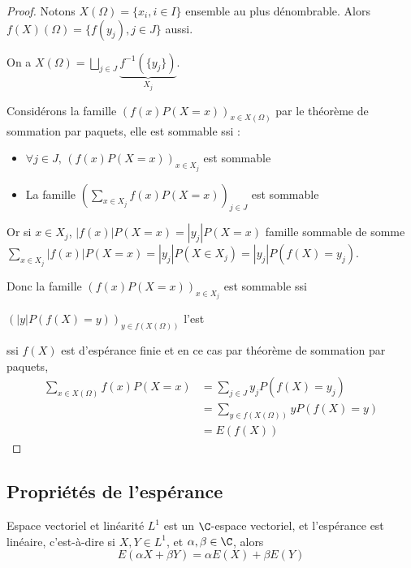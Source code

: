 \begin{proof}
    Notons $X(\Omega) = \{x_i, i \in I\}$ ensemble au plus dénombrable. Alors 
    $f(X)(\Omega) = \{f(y_j), j \in J\}$ aussi.

    On a $X(\Omega) = \bigsqcup_{j \in J} \underbrace{f^{-1}(\{y_j\})}_{X_j}$.

    Considérons la famille $(f(x) P(X = x))_{x \in X(\Omega)}$ par le théorème de sommation 
    par paquets, elle est sommable ssi : 
    \begin{itemize}
        \item $\forall j \in J, \, (f(x) P(X = x))_{x \in X_j}$ est sommable
        \item La famille $\displaystyle \left(\sum_{x \in X_j} f(x) P(X = x)\right)_{j \in J}$ est sommable
    \end{itemize}

    Or si $x \in X_j$, $|f(x)| P(X = x) = |y_j| P(X = x)$ famille sommable 
    de somme $\displaystyle \sum_{x \in X_j} |f(x)| P(X = x) = |y_j| P(X \in X_j) = |y_j| P(f(X) = y_j)$.

    Donc la famille $(f(x) P(X = x))_{x \in X_j}$ est sommable ssi 

    $(|y| P(f(X) = y))_{y \in f(X(\Omega))}$ l'est 

    ssi $f(X)$ est d'espérance finie
    et en ce cas par théorème de sommation par paquets,
    \begin{align}
        \sum_{x \in X(\Omega)} f(x) P(X = x) & = \sum_{j \in J} y_j P(f(X) = y_j) \\
        & = \sum_{y \in f(X(\Omega))} y P(f(X) = y) \\
        & = E(f(X))
    \end{align}
\end{proof}

\subsection{Propriétés de l'espérance}

\begin{proposition}{Espace vectoriel et linéarité}{}
    $L^1$ est un $\C$-espace vectoriel, et l'espérance est linéaire, c'est-à-dire si 
    $X, Y \in L^1$, et $\alpha, \beta \in \C$, alors
    $$ E(\alpha X + \beta Y) = \alpha E(X) + \beta E(Y) $$
\end{proposition}


